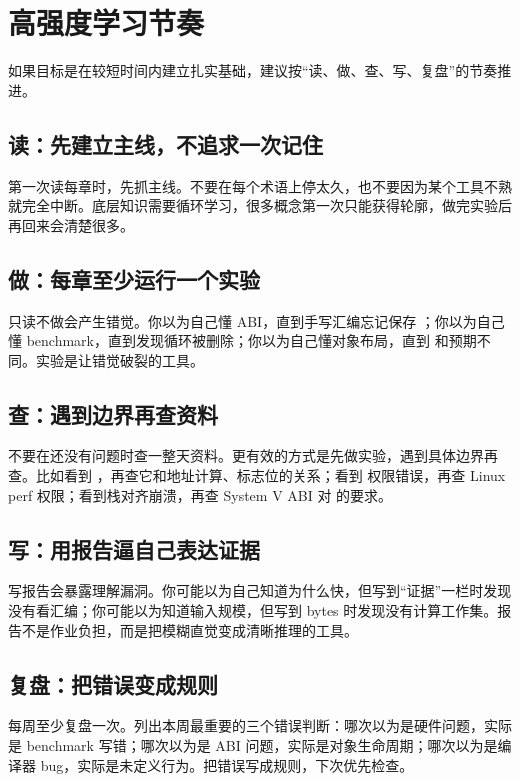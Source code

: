 \section{高强度学习节奏}

如果目标是在较短时间内建立扎实基础，建议按“读、做、查、写、复盘”的节奏推进。

\subsection{读：先建立主线，不追求一次记住}

第一次读每章时，先抓主线。不要在每个术语上停太久，也不要因为某个工具不熟就完全中断。底层知识需要循环学习，很多概念第一次只能获得轮廓，做完实验后再回来会清楚很多。

\subsection{做：每章至少运行一个实验}

只读不做会产生错觉。你以为自己懂 ABI，直到手写汇编忘记保存 ；你以为自己懂 benchmark，直到发现循环被删除；你以为自己懂对象布局，直到  和预期不同。实验是让错觉破裂的工具。

\subsection{查：遇到边界再查资料}

不要在还没有问题时查一整天资料。更有效的方式是先做实验，遇到具体边界再查。比如看到 ，再查它和地址计算、标志位的关系；看到  权限错误，再查 Linux perf 权限；看到栈对齐崩溃，再查 System V ABI 对  的要求。

\subsection{写：用报告逼自己表达证据}

写报告会暴露理解漏洞。你可能以为自己知道为什么快，但写到“证据”一栏时发现没有看汇编；你可能以为知道输入规模，但写到 bytes 时发现没有计算工作集。报告不是作业负担，而是把模糊直觉变成清晰推理的工具。

\subsection{复盘：把错误变成规则}

每周至少复盘一次。列出本周最重要的三个错误判断：哪次以为是硬件问题，实际是 benchmark 写错；哪次以为是 ABI 问题，实际是对象生命周期；哪次以为是编译器 bug，实际是未定义行为。把错误写成规则，下次优先检查。

